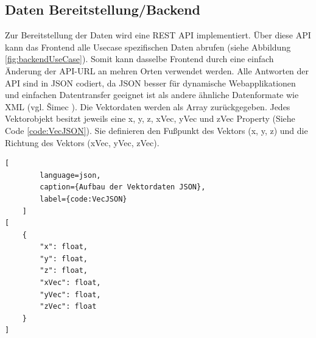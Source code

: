 \subsection{Daten Bereitstellung/Backend}
\label{section:Backend}

Zur Bereitstellung der Daten wird eine REST API implementiert.
Über diese API kann das Frontend alle Usecase spezifischen Daten
abrufen (siehe Abbildung \ref{fig:backendUseCase}). Somit kann dasselbe Frontend durch eine einfach Änderung der API-URL an mehren
Orten verwendet werden. Alle Antworten der API sind in JSON codiert,
da JSON besser für dynamische Webapplikationen und einfachen
Datentransfer geeignet ist als andere ähnliche Datenformate wie
XML (vgl. Šimec \cite{comparisonJsonXml}). Die Vektordaten werden
als Array zurückgegeben. Jedes Vektorobjekt besitzt jeweils eine
x, y, z, xVec, yVec und zVec Property (Siehe Code \ref{code:VecJSON}).
Sie definieren den Fußpunkt des Vektors (x, y, z) und die Richtung
des Vektors (xVec, yVec, zVec).

\begin{codeblock}
	\begin{lstlisting}[
		language=json,
		caption={Aufbau der Vektordaten JSON},
		label={code:VecJSON}
	]
[
	{
		"x": float,
		"y": float,
		"z": float,
		"xVec": float,
		"yVec": float,
		"zVec": float
	}
]
	\end{lstlisting}
\end{codeblock}

